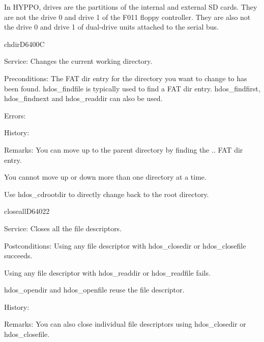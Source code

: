 In HYPPO, drives are the partitions of the internal and external SD cards.
They are not the drive 0 and drive 1 of the F011 floppy controller. They
are also not the drive 0 and drive 1 of dual-drive units attached to the serial
bus.


\begin{hyppotrap}{chdir}{D640}{0C}
\item [Service:]
  Changes the current working directory.
\item [Preconditions:]
  The FAT dir entry for the directory you want to change to has been
  found. hdos\_findfile is typically used to find a FAT dir entry.
  hdos\_findfirst, hdos\_findnext and hdos\_readdir can also be used.
\item [Errors:]
\item [History:]
\item [Remarks:]
  You can move up to the parent directory by finding the .. FAT dir entry.

  You cannot move up or down more than one directory at a time.

  Use hdos\_cdrootdir to directly change back to the root directory.
\end{hyppotrap}


\newpage
\begin{hyppotrap}{closeall}{D640}{22}
\item [Service:]
  Closes all the file descriptors.
\item [Postconditions:]
  Using any file descriptor with hdos\_closedir or hdos\_closefile succeeds.

  Using any file descriptor with hdos\_readdir or hdos\_readfile fails.

  hdos\_opendir and hdos\_openfile reuse the file descriptor.
\item [History:]
\item [Remarks:]
  You can also close individual file descriptors using hdos\_closedir or
  hdos\_closefile.
\end{hyppotrap}


